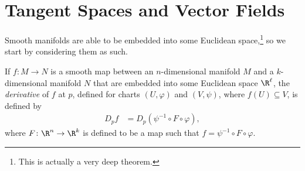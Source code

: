 \documentclass[10pt]{mypackage}
\begin{document}
\section{Tangent Spaces and Vector Fields}%
Smooth manifolds are able to be embedded into some Euclidean space,\footnote{This is actually a very deep theorem.} so we start by considering them as such.
\begin{definition}
  If $f\colon M\rightarrow N$ is a smooth map between an $n$-dimensional manifold $M$ and a $k$-dimensional manifold $N$ that are embedded into some Euclidean space $\R^{\ell}$, the \textit{derivative} of $f$ at $p$, defined for charts $\left( U,\varphi \right)$ and $\left( V,\psi \right)$, where $f(U)\subseteq V$, is defined by
  \begin{align*}
    D_{p}f &= D_{p}\left( \psi^{-1}\circ F\circ \varphi \right),
  \end{align*}
  where $F\colon \R^{n}\rightarrow \R^{k}$ is defined to be a map such that $f = \psi^{-1}\circ F \circ \varphi$.
\end{definition}
\end{document}
